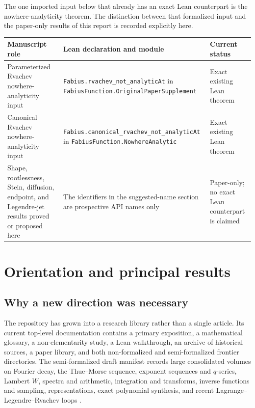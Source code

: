 \documentclass[11pt,oneside]{article}
\theoremstyle{definition}
\theoremstyle{remark}
\newcommand{\lean}[1]{%
  \ifmmode\text{\nolinkurl{#1}}\else\nolinkurl{#1}\fi}
\begin{document}
The one imported input below that already has an exact Lean counterpart is the
nowhere-analyticity theorem.  The distinction between that formalized input and
the paper-only results of this report is recorded explicitly here.

\begin{center}
\small
\begin{tabularx}{0.96\textwidth}{>{\raggedright\arraybackslash}p{} X >{\raggedright\arraybackslash}p{}}
\toprule
Manuscript role & Lean declaration and module & Current status\\
\midrule
Parameterized Rvachev nowhere-analyticity input &
\lean{Fabius.rvachev_not_analyticAt} in
\lean{FabiusFunction.OriginalPaperSupplement} &
Exact existing Lean theorem\\
Canonical Rvachev nowhere-analyticity input &
\lean{Fabius.canonical_rvachev_not_analyticAt} in
\lean{FabiusFunction.NowhereAnalytic} &
Exact existing Lean theorem\\
Shape, rootlessness, Stein, diffusion, endpoint, and Legendre-jet results
proved or proposed here &
The identifiers in the suggested-name section are prospective API names only &
Paper-only; no exact Lean counterpart is claimed\\
\bottomrule
\end{tabularx}
\end{center}

\tableofcontents
\listoffigures


\section{Orientation and principal results}

\subsection{Why a new direction was necessary}
The repository has grown into a research library rather than a single article.
Its current top-level documentation contains a primary exposition, a mathematical
glossary, a non-elementarity study, a Lean walkthrough, an archive of historical
sources, a paper library, and both non-formalized and semi-formalized frontier
directories.  The semi-formalized draft manifest records large consolidated
volumes on Fourier decay, the Thue--Morse sequence, exponent sequences and
$q$-series, Lambert $W$, spectra and arithmetic, integration and transforms,
inverse functions and sampling, representations, exact polynomial synthesis,
and recent Lagrange--Legendre--Rvachev loops \cite{repo,manifest}.
\end{document}
